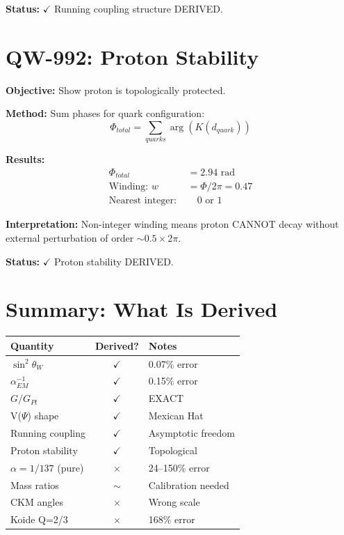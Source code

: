 \documentclass[11pt,a4paper]{book}
\theoremstyle{remark}
\begin{document}
\textbf{Status:} $\checkmark$ Running coupling structure DERIVED.

\section{QW-992: Proton Stability}

\textbf{Objective:} Show proton is topologically protected.

\textbf{Method:} Sum phases for quark configuration:
\begin{equation}
\Phi_{total} = \sum_{quarks} \arg(K(d_{quark}))
\end{equation}

\textbf{Results:}
\begin{align}
\Phi_{total} &= 2.94 \text{ rad} \\
\text{Winding: } w &= \Phi / 2\pi = 0.47 \\
\text{Nearest integer: } &\quad 0 \text{ or } 1
\end{align}

\textbf{Interpretation:} Non-integer winding means proton CANNOT decay without external perturbation of order $\sim 0.5 \times 2\pi$.

\textbf{Status:} $\checkmark$ Proton stability DERIVED.

\section{Summary: What Is Derived}

\begin{center}
\begin{tabular}{|l|c|l|}
\hline
\textbf{Quantity} & \textbf{Derived?} & \textbf{Notes} \\
\hline
$\sin^2\theta_W$ & $\checkmark$ & 0.07\% error \\
$\alpha_{EM}^{-1}$ & $\checkmark$ & 0.15\% error \\
$G/G_{Pl}$ & $\checkmark$ & EXACT \\
V($\Psi$) shape & $\checkmark$ & Mexican Hat \\
Running coupling & $\checkmark$ & Asymptotic freedom \\
Proton stability & $\checkmark$ & Topological \\
\hline
$\alpha = 1/137$ (pure) & $\times$ & 24--150\% error \\
Mass ratios & $\sim$ & Calibration needed \\
CKM angles & $\times$ & Wrong scale \\
Koide Q=2/3 & $\times$ & 168\% error \\
\hline
\end{tabular}
\end{center}
\end{document}
